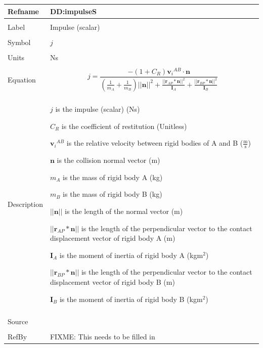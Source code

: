 \documentclass[12pt]{article}
\begin{document}
\noindent \begin{minipage}{\textwidth}
\begin{tabular}{p{} p{}}
\toprule \textbf{Refname} & \textbf{DD:impulseS}
\label{DD:impulseS}
\\ \midrule \\
Label & Impulse (scalar)
\\ \midrule \\
Symbol & $j$
\\ \midrule \\
Units & Ns
\\ \midrule \\
Equation & \begin{dmath}
           j=\frac{-\left(1+{C_{R}}\right) {{\mathbf{v}_{i}}^{AB}}\cdot{}\mathbf{n}}{\left(\frac{1}{{m_{A}}}+\frac{1}{{m_{B}}}\right) ||\mathbf{n}||^{2}+\frac{||{\mathbf{r}_{AP}}*\mathbf{n}||^{2}}{{\mathbf{I}_{A}}}+\frac{||{\mathbf{r}_{BP}}*\mathbf{n}||^{2}}{{\mathbf{I}_{B}}}}
           \end{dmath}
\\ \midrule \\
Description & \begin{symbDescription}
              \item{$j$ is the impulse (scalar) (Ns)}
              \item{${C_{R}}$ is the coefficient of restitution (Unitless)}
              \item{${{\mathbf{v}_{i}}^{AB}}$ is the relative velocity between rigid bodies of A and B ($\frac{\text{m}}{\text{s}}$)}
              \item{$\mathbf{n}$ is the collision normal vector (m)}
              \item{${m_{A}}$ is the mass of rigid body A (kg)}
              \item{${m_{B}}$ is the mass of rigid body B (kg)}
              \item{$||\mathbf{n}||$ is the length of the normal vector (m)}
              \item{$||{\mathbf{r}_{AP}}*\mathbf{n}||$ is the length of the perpendicular vector to the contact displacement vector of rigid body A (m)}
              \item{${\mathbf{I}_{A}}$ is the moment of inertia of rigid body A (kg$\text{m}^{2}$)}
              \item{$||{\mathbf{r}_{BP}}*\mathbf{n}||$ is the length of the perpendicular vector to the contact displacement vector of rigid body B (m)}
              \item{${\mathbf{I}_{B}}$ is the moment of inertia of rigid body B (kg$\text{m}^{2}$)}
              \end{symbDescription}
\\ \midrule \\
Source & 
\\ \midrule \\
RefBy & FIXME: This needs to be filled in
\\ \bottomrule \end{tabular}
\end{minipage}\\
\end{document}
